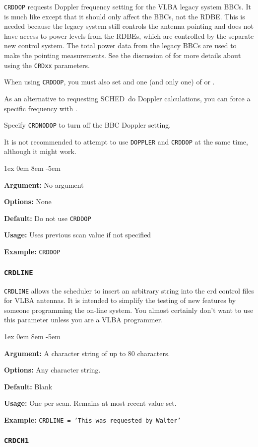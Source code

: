 \documentclass{report}
\newcommand{\schedb}{{\sc SCHED~}}
\newcommand{\rcwbox}[5]{
  \begin{list}{}{\parsep 1ex  \itemsep 0em
                 \leftmargin 8em  \itemindent -5em }
    \item {\bf Argument:} #1
    \item {\bf Options:}  #2
    \item {\bf Default:}  #3
    \item {\bf Usage:}    #4
    \item {\bf Example:}  #5
  \end{list}
}
\begin{document}
{\tt CRDDOP} requests Doppler frequency setting for the VLBA legacy
system BBCs.  It is much like 
except that it should only affect the BBCs, not the RDBE.  This is
needed because the legacy system still controls the antenna pointing
and does not have access to power levels from the RDBEs, which are
controlled by the separate new control system.  The total power 
data from the legacy BBCs are used to make the pointing measurements.
See the discussion of  for more
details about using the {\tt CRDxx} parameters.

When using {\tt CRDDOP}, you must also set  and one (and only one) of 
or .  

As an alternative to requesting \schedb do Doppler
calculations, you can force a specific frequency with .

Specify {\tt CRDNODOP} to turn off the BBC Doppler setting.

It is not recommended to attempt to use {\tt DOPPLER} and {\tt CRDDOP}
at the same time, although it might work.

\rcwbox
{No argument}
{None}
{Do not use {\tt CRDDOP}}
{Uses previous scan value if not specified}
{{\tt CRDDOP}}

\subsubsection{\label{MP:CRDLINE}{\tt CRDLINE}}

{\tt CRDLINE} allows the scheduler to insert an arbitrary string
into the crd control files for VLBA antennas.  It is intended to
simplify the testing of new features by someone programming the
on-line system.  You almost certainly don't want to use this parameter
unless you are a VLBA programmer.

\rcwbox
{A character string of up to 80 characters.}
{Any character string.}
{Blank}
{One per scan.  Remains at most recent value set.}
{{\tt CRDLINE = 'This was requested by Walter'}}


\subsubsection{\label{MP:CRDCH1}{\tt CRDCH1}}
\end{document}

